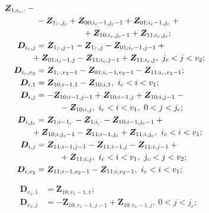 \begin{multicols}{2}
\begin{align*}
\boldsymbol{Z}_{1;i_c,\cdot} -{}\\
&{}- \boldsymbol{Z}_{1;\cdot,j_c} + \boldsymbol{Z}_{00;i_c-1,j_c-1} + \boldsymbol{Z}_{01;i_c-1,j_c} + {}\\
&\hspace*{20mm}{}+
\boldsymbol{Z}_{10;i_c,j_c-1} + \boldsymbol{Z}_{11;i_c,j_c}; \\
  \boldsymbol{D}_{i_c,j} &= \boldsymbol{Z}_{1;\cdot,j-1} - \boldsymbol{Z}_{1;\cdot,j} - \boldsymbol{Z}_{01;i_c-1,j-1} + {}\\
&  \hspace*{-2mm}
{}+
\boldsymbol{Z}_{01;i_c-1,j} - \boldsymbol{Z}_{11;i_c,j-1} + \boldsymbol{Z}_{11;i_c,j}, \ %
j_c < j < v_2; \\
  \boldsymbol{D}_{i_c,v_2} &= \boldsymbol{Z}_{1;\cdot,v_2-1} - \boldsymbol{Z}_{01;i_c-1,v_2-1} - \boldsymbol{Z}_{11;i_c,v_2-1}; \\
  \boldsymbol{D}_{i,1} &= \boldsymbol{Z}_{10;i-1,1} - \boldsymbol{Z}_{10;i,1},\ i_c < i < v_1; \\
  \boldsymbol{D}_{i,j} &= -\boldsymbol{Z}_{10;i-1,j-1} + \boldsymbol{Z}_{10;i-1,j} + \boldsymbol{Z}_{10;i,j-1} -{}\\
&  \hspace*{10mm}{}- 
\boldsymbol{Z}_{10;i,j},\ i_c < i < v_1,\ 0 < j < j_c; \\
  \boldsymbol{D}_{i,j_c} &= \boldsymbol{Z}_{1;i-1,\cdot} - \boldsymbol{Z}_{1;i,\cdot} - \boldsymbol{Z}_{10;i-1,j_c-1} + {}\\
  & \hspace*{-2mm}
  {}+
\boldsymbol{Z}_{10;i,j_c-1} - \boldsymbol{Z}_{11;i-1,j_c} + \boldsymbol{Z}_{11;i,j_c}, \ 
 i_c < i < v_1; \\
  \boldsymbol{D}_{i,j} &= \boldsymbol{Z}_{11;i-1,j-1} - \boldsymbol{Z}_{11;i-1,j} - \boldsymbol{Z}_{11;i,j-1} +{}\\
& \hspace*{10mm} {}+ \boldsymbol{Z}_{11;i,j},\  i_c < i < v_1,\  j_c < j < v_2; \\
\boldsymbol{D}_{i,v_2} &= \boldsymbol{Z}_{11;i-1,v_2-1} - \boldsymbol{Z}_{11;i,v_2-1},\ i_c < i < v_1; 
  \end{align*}
  
  \vspace*{-16pt}
  
 \noindent
    \begin{align*}
    \boldsymbol{D}_{v_1,1} &= \boldsymbol{Z}_{10;v_1-1,1}; \\
  \boldsymbol{D}_{v_1,j} & = -\boldsymbol{Z}_{10;v_1-1,j-1} + \boldsymbol{Z}_{10;v_1-1,j},\ 0 < j < j_c; 
  \end{align*}
  

\end{multicols}
